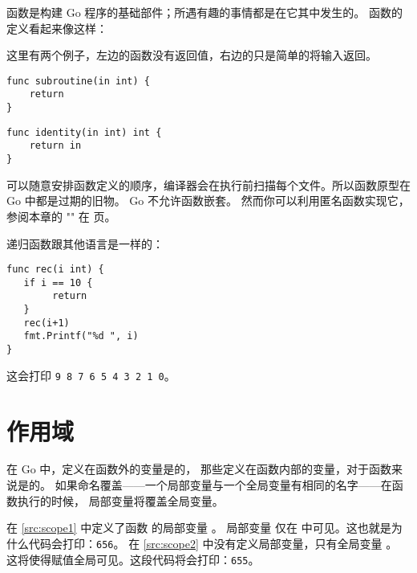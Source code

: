 
\noindent{}函数是构建 Go 程序的基础部件；所遇有趣的事情都是在它其中发生的。
函数的定义看起来像这样：

\showremarks
这里有两个例子，左边的函数没有返回值，右边的只是简单的将输入返回。

\begin{minipage}{.5\textwidth}
\begin{lstlisting}
func subroutine(in int) {
    return
}
\end{lstlisting}
\end{minipage}
\begin{minipage}{.5\textwidth}
\begin{lstlisting}
func identity(in int) int {
    return in
}
\end{lstlisting}
\end{minipage}

可以随意安排函数定义的顺序，编译器会在执行前扫描每个文件。所以函数原型在 Go 中都是过期的旧物。
Go 不允许函数嵌套。
然而你可以利用匿名函数实现它，参阅本章的 "" 在
\pageref{sec:functions as values} 页。


递归函数跟其他语言是一样的：
\begin{lstlisting}[caption=递归函数]
func rec(i int) {
   if i == 10 {
        return
   }
   rec(i+1)
   fmt.Printf("%d ", i)
}
\end{lstlisting}
这会打印 \texttt{9 8 7 6 5 4 3 2 1 0}。

\section{作用域}
在 Go 中，定义在函数外的变量是的，
那些定义在函数内部的变量，对于函数来说是的。
如果命名覆盖——一个局部变量与一个全局变量有相同的名字——在函数执行的时候，
局部变量将覆盖全局变量。

\begin{minipage}{.5\textwidth}

\hfill
\vfill
\end{minipage}
\hfill
\begin{minipage}{.5\textwidth}

\hfill
\vfill
\end{minipage}

在 \ref{src:scope1} 中定义了函数  的局部变量 。
局部变量  仅在  中可见。这也就是为什么代码会打印：\texttt{656}。
在 \ref{src:scope2} 中没有定义局部变量，只有全局变量 。
这将使得赋值全局可见。这段代码将会打印：\texttt{655}。

